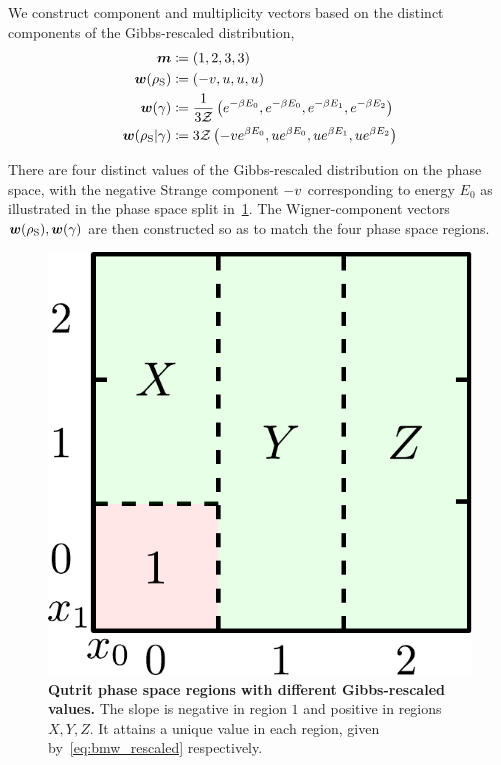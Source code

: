 \documentclass[pra,
aps,
twocolumn,
superscriptaddress,
groupedaddress,
nofootinbib,
reprint
]{revtex4-1}
\begin{document}
We construct component and multiplicity vectors based on the distinct components of the Gibbs-rescaled distribution,
\begin{align}
	\bm{m} &\coloneqq (1,2,3,3) \\
	\bm{w}(\rho_{\rm{S}}) &\coloneqq (-v, u, u, u) \\
	\bm{w}(\gamma) &\coloneqq \frac{1}{3\mathcal{Z}} \left( e^{-\beta E_0}, e^{-\beta E_0}, e^{-\beta E_1}, e^{-\beta E_2} \right) \\
	\bm{w}(\rho_{\rm{S}} | \gamma) &\coloneqq 3\mathcal{Z} \left( -v e^{\beta E_0}, u e^{\beta E_0}, u e^{\beta E_1}, u e^{\beta E_2} \right) \label{eq:bmw_rescaled}
\end{align}

There are four distinct values of the Gibbs-rescaled distribution on the phase space, with the negative Strange component $-v$ corresponding to energy $E_0$ as illustrated in the phase space split in~\cref{fig:pd_split_thermal}.
The Wigner-component vectors $\bm{w}(\rho_{\rm{S}}), \bm{w}(\gamma)$ are then constructed so as to match the four phase space regions.
\begin{figure}[h]
    \centering
    \includegraphics[scale=0.5]{figs/pd_split_thermal.pdf}
    \caption{\textbf{Qutrit phase space regions with different Gibbs-rescaled values.}
    The slope is negative in region $1$ and positive in regions $X,Y,Z$.
    It attains a unique value in each region, given by~\cref{eq:bmw_rescaled} respectively.
    }
    \label{fig:pd_split_thermal}
\end{figure}
\end{document}
